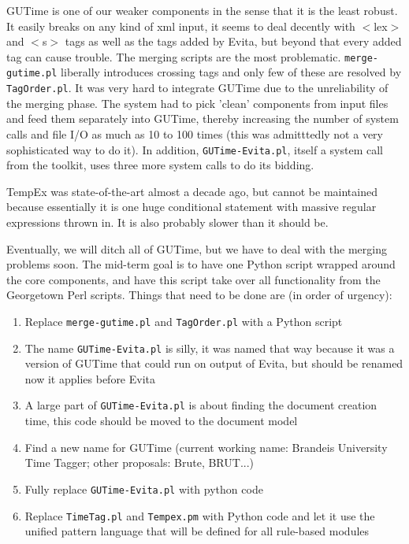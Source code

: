 \documentclass[11pt]{article}
\begin{document}

GUTime is one of our weaker components in the sense that it is the least robust. It easily breaks on any kind of xml input, it seems to deal decently with $<$lex$>$ and $<$s$>$ tags as well as the tags added by Evita, but beyond that every added tag can cause trouble. The merging scripts are the most problematic. {\tt merge-gutime.pl} liberally introduces crossing tags and only few of these are resolved by {\tt TagOrder.pl}. It was very hard to integrate GUTime due to the unreliability of the merging phase. The system had to pick 'clean' components from input files and feed them separately into GUTime, thereby increasing the number of system calls and file I/O as much as 10 to 100 times (this was admitttedly not a very sophisticated way to do it). In addition, {\tt GUTime-Evita.pl}, itself a system call from the toolkit, uses three more system calls to do its bidding.

TempEx was state-of-the-art almost a decade ago, but cannot be maintained because essentially it is one huge conditional statement with massive regular expressions thrown in. It is also probably slower than it should be.


Eventually, we will ditch all of GUTime, but we have to deal with the merging problems soon. The mid-term goal is to have one Python script wrapped around the core components, and have this script take over all functionality from the Georgetown Perl scripts. Things that need to be done are (in order of urgency):

\begin{enumerate}

\item Replace {\tt merge-gutime.pl} and {\tt TagOrder.pl} with a Python script

\item The name {\tt GUTime-Evita.pl} is silly, it was named that way because it was a version of GUTime that could run on output of Evita, but should be renamed now it applies before Evita 

\item A large part of {\tt GUTime-Evita.pl} is about finding the document creation time, this code should be moved to the document model

\item Find a new name for GUTime (current working name: Brandeis University Time Tagger; other proposals: Brute, BRUT...)

\item Fully replace {\tt GUTime-Evita.pl} with python code

\item Replace {\tt TimeTag.pl} and {\tt Tempex.pm} with Python code and let it use the unified pattern language that will be defined for all rule-based modules

\end{enumerate}
\end{document}
